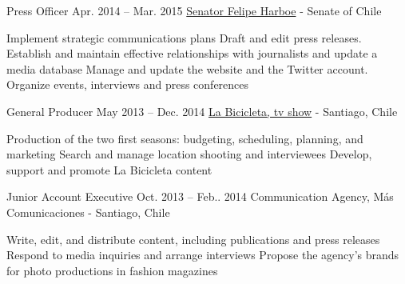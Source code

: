 \begin{joblist}[13.2][7.8][3.4]
\item[Press Officer]{Apr. 2014 -- Mar. 2015}
     {
     \href{https://www.harboe.cl/}{Senator Felipe Harboe} - Senate of Chile
     } 
	 {
            \vspace{-0.5cm}
			\iftbftiny \setlength{\parskip}{-10pt} \fi
			\begin{itemize}
			  \iftbftiny \setlength\itemsep{-3pt} \fi
			  \cvitem[\checkmark] Implement strategic communications plans
			  \cvitem[\checkmark] Draft and edit press releases. Establish and maintain effective relationships with journalists and update a media database
			  \cvitem[\checkmark] Manage and update the website and the Twitter account. Organize events, interviews and press conferences
			\end{itemize}     
	}
    
        
\item[General Producer]{May 2013 -- Dec. 2014}
     {
     \href{https://www.13.cl/c/programas/la-bicicleta}{La Bicicleta, tv show} - Santiago, Chile
     }
     {	
             \vspace{-0.5cm}
			\iftbftiny \setlength{\parskip}{-10pt} \fi
			\begin{itemize}
			  \iftbftiny \setlength\itemsep{-3pt} \fi
			  \cvitem[\checkmark] Production of the two first seasons: budgeting, scheduling, planning, and marketing
			  \cvitem[\checkmark] Search and manage location shooting and interviewees 
			  \cvitem[\checkmark] Develop, support and promote La Bicicleta content%
			\end{itemize}     
	}



\item[Junior Account Executive ]{Oct. 2013 -- Feb.. 2014 }     
  	{
  	Communication Agency, Más Comunicaciones - Santiago, Chile
  	}     
  	{
        \vspace{-0.5cm}
		\iftbftiny \setlength{\parskip}{-10pt} \fi
		\begin{itemize}
			  \iftbftiny \setlength\itemsep{-3pt} \fi
			  \cvitem[\checkmark] Write, edit, and distribute content, including publications and press releases 
			  \cvitem[\checkmark] Respond to media inquiries and arrange interviews
			  \cvitem[\checkmark] Propose the agency’s brands for photo productions in fashion magazines
		\end{itemize}       
	}





\end{joblist}
